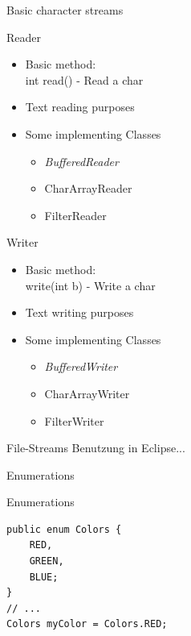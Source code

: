 
\begin{frame}{Basic character streams}
	\begin{multicols}{2}
	Reader\
	\begin{itemize}
		\item Basic method: \\ int read() - Read a char
		\item Text reading purposes
		\item Some implementing Classes
		\begin{itemize}
			\item \emph{BufferedReader}
			\item CharArrayReader
			\item FilterReader
		\end{itemize}
	\end{itemize}
	\columnbreak
	Writer\\
	\begin{itemize}
		\item Basic method: \\ write(int b) - Write a char
		\item Text writing purposes
		\item Some implementing Classes
		\begin{itemize}
			\item \emph{BufferedWriter}
			\item CharArrayWriter
			\item FilterWriter
		\end{itemize}
	\end{itemize}
	\end{multicols}
\end{frame}

\begin{frame}{File-Streams}
	Benutzung in Eclipse...
\end{frame}

\begin{frame}{Enumerations}
	
\end{frame}

\begin{frame}[fragile]{Enumerations}
\begin{lstlisting}
public enum Colors {
	RED,
	GREEN,
	BLUE;
}
// ...
Colors myColor = Colors.RED;
\end{lstlisting}
\end{frame}

